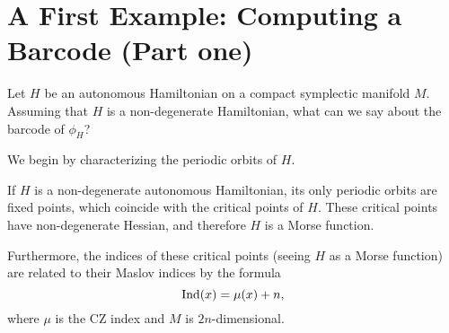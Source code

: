 \chapter{A First Example: Computing a Barcode (Part one)}\label{subsecautonomous}

Let $H$ be an autonomous Hamiltonian on a compact symplectic manifold $M$. Assuming that $H$ is a non-degenerate Hamiltonian, what can we say about the barcode of $\phi_H$?

We begin by characterizing the periodic orbits of $H$.

\begin{prop}\label{authamfloermorse}
If $H$ is a non-degenerate autonomous Hamiltonian, its only periodic orbits are fixed points, which coincide with the critical points of $H$. These critical points have non-degenerate Hessian, and therefore $H$ is a Morse function.

Furthermore, the indices of these critical points (seeing $H$ as a Morse function) are related to their Maslov indices by the formula
\begin{equation}
\operatorname{Ind}(x) = \mu(x) + n,
\end{equation}
where $\mu$ is the CZ index and $M$ is $2n$-dimensional.
\end{prop}


